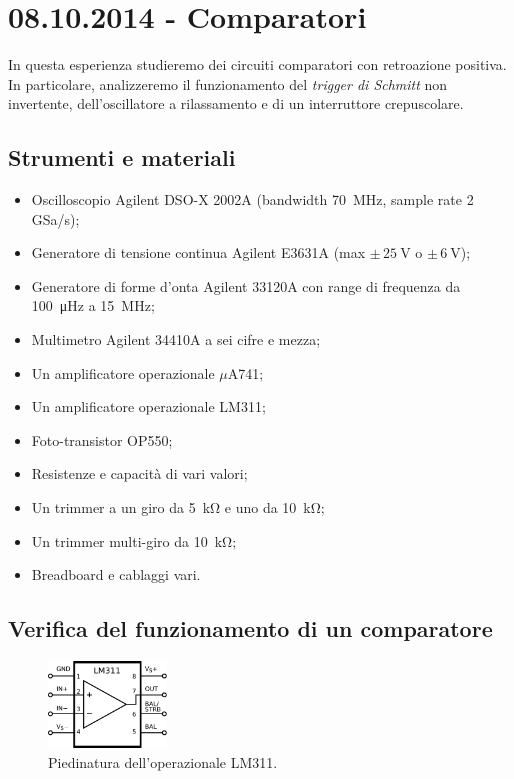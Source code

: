 \section{08.10.2014 - Comparatori}

In questa esperienza studieremo dei circuiti comparatori con retroazione positiva. In particolare, analizzeremo il funzionamento del \textit{trigger di Schmitt} non invertente, dell'oscillatore a rilassamento e di un interruttore crepuscolare.

\subsection*{Strumenti e materiali}

\begin{itemize} [noitemsep]
\item Oscilloscopio Agilent DSO-X 2002A (bandwidth \SI{70}{\mega\hertz}, sample rate \num{2} GSa/s);
\item Generatore di tensione continua Agilent E3631A (max $\pm \, \SI{25}{\volt}$ o $\pm \, \SI{6}{\volt}$);
\item Generatore di forme d'onta Agilent 33120A con range di frequenza da \SI{100}{\micro\hertz} a \SI{15}{\mega\hertz};
\item Multimetro Agilent 34410A a sei cifre e mezza;
\item Un amplificatore operazionale $\mu$A741;
\item Un amplificatore operazionale LM311;
\item Foto-transistor OP550;
\item Resistenze e capacità di vari valori;
\item Un trimmer a un giro da \SI{5}{\kilo\ohm} e uno da \SI{10}{\kilo\ohm};
\item Un trimmer multi-giro da \SI{10}{\kilo\ohm};
\item Breadboard e cablaggi vari.
\end{itemize}

\subsection{Verifica del funzionamento di un comparatore}

\begin{figure}
  \begin{center}
    \includegraphics[width=0.280\textwidth]{../E04/latex/LM311.pdf}
  \end{center}
  \caption{Piedinatura dell'operazionale LM311.}
  \label{cir4:piedinatura_LM311}
\end{figure}

